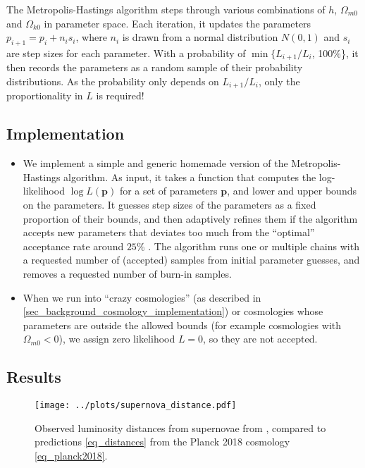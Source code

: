 \documentclass[10pt,a4paper]{article}
\begin{document}
The Metropolis-Hastings algorithm steps through various combinations of $h$, $\Omega_{m0}$ and $\Omega_{k0}$ in parameter space.
Each iteration, it updates the parameters $p_{i+1} = p_i + n_i s_i$,
where $n_i$ is drawn from a normal distribution $N(0,1)$ and $s_i$ are step sizes for each parameter.
With a probability of $\min\big\{L_{i+1}/L_i$, 100\%\big\},
it then records the parameters as a random sample of their probability distributions.
As the probability only depends on $L_{i+1}/L_i$, only the proportionality in $L$ is required!

\subsection{Implementation}

\begin{itemize}
	\item We implement a simple and generic homemade version of the Metropolis-Hastings algorithm.
	      As input, it takes a function that computes the log-likelihood $\log L(\mathbf{p})$ for a set of parameters $\mathbf{p}$,
	      and lower and upper bounds on the parameters.
	      It guesses step sizes of the parameters as a fixed proportion of their bounds,
		  and then adaptively refines them if the algorithm accepts new parameters that deviates too much from the ``optimal'' acceptance rate around $25\%$ \cite{gelmanWeakConvergenceOptimal1997}.
		  The algorithm runs one or multiple chains with a requested number of (accepted) samples from initial parameter guesses,
		  and removes a requested number of burn-in samples.
	\item When we run into ``crazy cosmologies'' (as described in \cref{sec_background_cosmology_implementation}) or cosmologies whose parameters are outside the allowed bounds (for example cosmologies with $\Omega_{m0} < 0$), we assign zero likelihood $L=0$, so they are not accepted.
\end{itemize}

\subsection{Results}

\begin{figure}
	\centering
	\texttt{[image: ../plots/supernova\_distance.pdf]}
	\caption{Observed luminosity distances from supernovae from \cite{betouleImprovedCosmologicalConstraints2014}, compared to predictions \eqref{eq_distances} from the Planck 2018 cosmology \eqref{eq_planck2018}.}
	\label{fig_luminosity_distances}
\end{figure}
\end{document}
